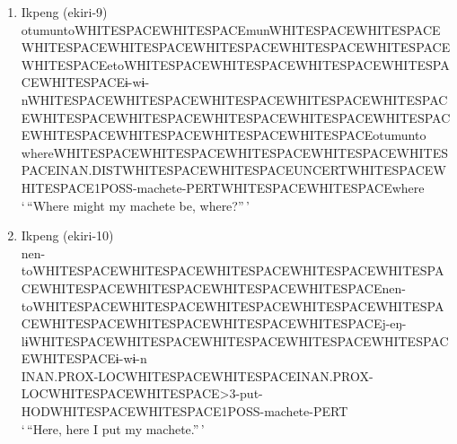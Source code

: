 \documentclass{article}
\begin{document}
\begin{enumerate}
\def\labelenumi{(\alph{enumi})}
\item
  Ikpeng (ekiri-9)\\
  otumunto\textbar WHITESPACE\textbar\textbar WHITESPACE\textbar mun\textbar WHITESPACE\textbar\textbar WHITESPACE\textbar\textbar WHITESPACE\textbar\textbar WHITESPACE\textbar\textbar WHITESPACE\textbar\textbar WHITESPACE\textbar\textbar WHITESPACE\textbar\textbar WHITESPACE\textbar eto\textbar WHITESPACE\textbar\textbar WHITESPACE\textbar\textbar WHITESPACE\textbar\textbar WHITESPACE\textbar\textbar WHITESPACE\textbar ɨ-wɨ-n\textbar WHITESPACE\textbar\textbar WHITESPACE\textbar\textbar WHITESPACE\textbar\textbar WHITESPACE\textbar\textbar WHITESPACE\textbar\textbar WHITESPACE\textbar\textbar WHITESPACE\textbar\textbar WHITESPACE\textbar\textbar WHITESPACE\textbar\textbar WHITESPACE\textbar\textbar WHITESPACE\textbar\textbar WHITESPACE\textbar\textbar WHITESPACE\textbar\textbar WHITESPACE\textbar otumunto\\
  where\textbar WHITESPACE\textbar\textbar WHITESPACE\textbar\textbar WHITESPACE\textbar\textbar WHITESPACE\textbar\textbar WHITESPACE\textbar INAN.DIST\textbar WHITESPACE\textbar\textbar WHITESPACE\textbar UNCERT\textbar WHITESPACE\textbar\textbar WHITESPACE\textbar1POSS-machete-PERT\textbar WHITESPACE\textbar\textbar WHITESPACE\textbar where\\
  `\,``Where might my machete be, where?''\,'
\item
  Ikpeng (ekiri-10)\\
  nen-to\textbar WHITESPACE\textbar\textbar WHITESPACE\textbar\textbar WHITESPACE\textbar\textbar WHITESPACE\textbar\textbar WHITESPACE\textbar\textbar WHITESPACE\textbar\textbar WHITESPACE\textbar\textbar WHITESPACE\textbar\textbar WHITESPACE\textbar nen-to\textbar WHITESPACE\textbar\textbar WHITESPACE\textbar\textbar WHITESPACE\textbar\textbar WHITESPACE\textbar\textbar WHITESPACE\textbar\textbar WHITESPACE\textbar\textbar WHITESPACE\textbar\textbar WHITESPACE\textbar\textbar WHITESPACE\textbar j-eŋ-lɨ\textbar WHITESPACE\textbar\textbar WHITESPACE\textbar\textbar WHITESPACE\textbar\textbar WHITESPACE\textbar\textbar WHITESPACE\textbar\textbar WHITESPACE\textbar ɨ-wɨ-n\\
  INAN.PROX-LOC\textbar WHITESPACE\textbar\textbar WHITESPACE\textbar INAN.PROX-LOC\textbar WHITESPACE\textbar\textbar WHITESPACE\textgreater3-put-HOD\textbar WHITESPACE\textbar\textbar WHITESPACE\textbar1POSS-machete-PERT\\
  `\,``Here, here I put my machete.''\,'
\end{enumerate}
\end{document}

